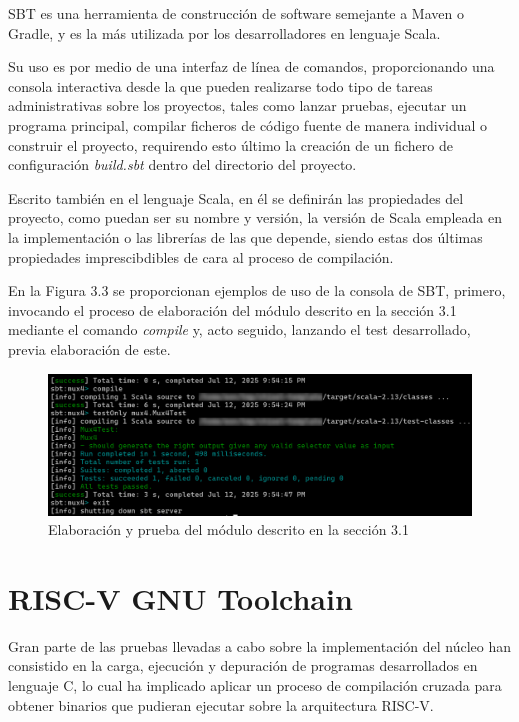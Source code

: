 SBT es una herramienta de construcción de software semejante a Maven o Gradle, y es la más utilizada por los desarrolladores en lenguaje Scala\cite{scalaSurvey}.

Su uso es por medio de una interfaz de línea de comandos, proporcionando una consola interactiva desde la que pueden realizarse todo tipo de tareas administrativas sobre los proyectos, tales como lanzar pruebas, ejecutar un programa principal, compilar ficheros de código fuente de manera individual o construir el proyecto, requirendo esto último la creación de un fichero de configuración \textit{build.sbt} dentro del directorio del proyecto.

Escrito también en el lenguaje Scala, en él se definirán las propiedades del proyecto, como puedan ser su nombre y versión, la versión de Scala empleada en la implementación o las librerías de las que depende, siendo estas dos últimas propiedades imprescibdibles de cara al proceso de compilación.

En la Figura 3.3 se proporcionan ejemplos de uso de la consola de SBT, primero, invocando el proceso de elaboración del módulo descrito en la sección 3.1 mediante el comando \textit{compile} y, acto seguido, lanzando el test desarrollado, previa elaboración de este.

\vspace{+0.3cm}
\begin{figure}[h]
  \centering
  \includegraphics[width=0.8 \linewidth]{res/img/sbt-usage-basic.png}
  \caption{Elaboración y prueba del módulo descrito en la sección 3.1}
\end{figure}

\section{RISC-V GNU Toolchain}

Gran parte de las pruebas llevadas a cabo sobre la implementación del núcleo han consistido en la carga, ejecución y depuración de programas desarrollados en lenguaje C, lo cual ha implicado aplicar un proceso de compilación cruzada para obtener binarios que pudieran ejecutar sobre la arquitectura RISC-V.

